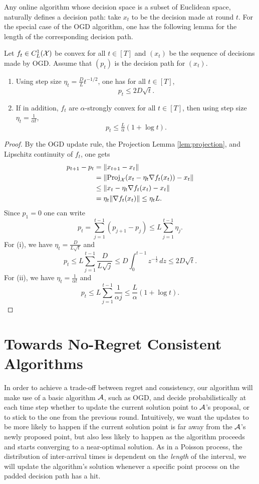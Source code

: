 Any online algorithm whose decision space is a subset of Euclidean space, naturally defines a decision path: take $x_t$ to be the decision made at round $t$. For the special case of the OGD algorithm, one has the following lemma for the length of the corresponding decision path. 
\begin{lemma}
  Let $f_t\in C^1_L(\mathcal{X})$ be convex for all $t\in[T]$ and $(x_t)$ be the sequence of decisions made by OGD. Assume that $(p_t)$ is the decision path for $(x_t)$.
  \begin{enumerate}[label=(\roman*)]
      \item Using step size $\eta_t = \frac{D}{L}t^{-1/2}$, one has for all $t \in [T]$,
         \[ p_t \leq  2D \sqrt{t}. \]
     \item If in addition, $f_t$ are $\alpha$-strongly convex for all $t\in [T]$, then using step size $\eta_t=\frac{1}{\alpha t}$,
         \[ p_t \leq \tfrac{L}{\alpha}(1+\log t). \]
  \end{enumerate}
  \label{lem:ogdpathlength}
\end{lemma}
\begin{proof}
    By the OGD update rule, the Projection Lemma \ref{lem:projection}, and Lipschitz continuity of $f_t$, one gets
 \begin{align*}
   p_{t+1}-p_t &= \|x_{t+1} - x_t\| \\
   &= \|\mathrm{Proj}_{\mathcal{X}}(x_t - \eta_t\nabla f_t(x_t))-x_t\| \\
  &\leq \|x_t - \eta_t\nabla f_t(x_t)-x_t\| \\
  &= \eta_t\|\nabla f_t(x_t)\| \leq \eta_t L.
 \end{align*}
Since $p_1 = 0$ one can write
\[
  p_t = \sum_{j=1}^{t-1} (p_{j+1} - p_j) \leq L\sum_{j=1}^{t-1} \eta_j.
\]
For (i), we have $\eta_t = \frac{D}{L\sqrt{t}}$ and
   \[
   p_t \leq L\sum_{j=1}^{t-1} \frac{D}{L\sqrt{j}} \leq D \int_0^{t-1} z^{-\frac{1}{2}}\,dz \leq 2D\sqrt{t}.
 \]
For (ii), we have $\eta_t = \frac{1}{\alpha t}$ and
  \[
    p_t \leq L \sum_{j=1}^{t-1} \frac{1}{\alpha j} \leq \frac{L}{\alpha}(1+\log t).
 \]
\end{proof}

\section{Towards No-Regret Consistent Algorithms}\label{sec:towardsolo}

In order to achieve a trade-off between regret and consistency, our algorithm will make use of a basic algorithm $\mathcal{A}$, such as OGD, and decide probabilistically at each time step whether to update the current solution point to $\mathcal{A}$'s proposal, or to stick to the one from the previous round. Intuitively, we want the updates to be more likely to happen if the current solution point is far away from the $\mathcal{A}$'s newly proposed point, but also less likely to happen as the algorithm proceeds and starts converging to a near-optimal solution. As in a Poisson process, the distribution of inter-arrival times is dependent on the \emph{length} of the interval, we will update the algorithm's solution whenever a specific point process on the padded decision path has a hit. 

